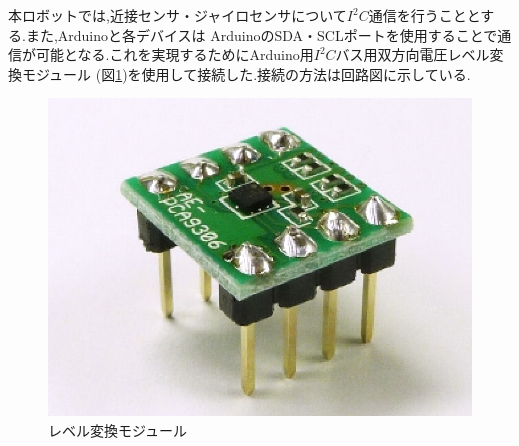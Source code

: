 本ロボットでは,近接センサ・ジャイロセンサについて$I^2 C$通信を行うこととする.また,Arduinoと各デバイスは
ArduinoのSDA・SCLポートを使用することで通信が可能となる.これを実現するためにArduino用$I^2 C$バス用双方向電圧レベル変換モジュール
(図\ref{level})を使用して接続した.接続の方法は回路図に示している.

\begin{figure}[b]
 \centering
 \includegraphics[width=0.4\hsize]{../kakeru/picture/level.eps}
    \caption{レベル変換モジュール}
    \label{level}
\end{figure}
